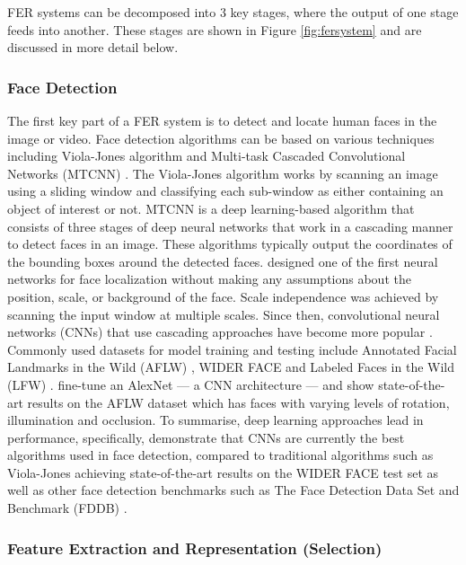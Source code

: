 \documentclass[12pt, a4paper]{article}
\begin{document}
FER systems can be decomposed into 3 key stages, where the output of one stage feeds into another. These stages are shown in Figure \ref{fig:fersystem} and are discussed in more detail below. 

\subsubsection{Face Detection}
\label{facedet}
The first key part of a FER system is to detect and locate human faces in the image or video. Face detection algorithms can be based on various techniques including Viola-Jones algorithm \citep{viola2001rapid} and Multi-task Cascaded Convolutional Networks (MTCNN) \citep{xiang2017joint}. The Viola-Jones algorithm  works by scanning an image using a sliding window and classifying each sub-window as either containing an object of interest or not. MTCNN is a deep learning-based algorithm that consists of three stages of deep neural networks that work in a cascading manner to detect faces in an image. These algorithms typically output the coordinates of the bounding boxes around the detected faces. \cite{vaillant1994original} designed one of the first neural networks for face localization without making any assumptions about the position, scale, or background of the face. Scale independence was achieved by scanning the input window at multiple scales. Since then, convolutional neural networks (CNNs) that use cascading approaches have become more popular \citep{li2015convolutional, xiang2017joint}. Commonly used datasets for model training and testing include Annotated Facial Landmarks in the Wild (AFLW) \citep{koestinger2011annotated}, WIDER FACE \citep{yang2016wider} and Labeled Faces in the Wild (LFW) \citep{huang2008labeled}. \cite{farfade2015multi} fine-tune an AlexNet --- a CNN architecture --- and show state-of-the-art results on the AFLW dataset which has faces with varying levels of rotation, illumination and occlusion. To summarise, deep learning approaches lead in performance, specifically, \cite{jiang2017face} demonstrate that CNNs are currently the best algorithms used in face detection, compared to traditional algorithms such as Viola-Jones achieving state-of-the-art results on the WIDER FACE test set as well as other face detection benchmarks such as The Face Detection Data Set and Benchmark (FDDB) \citep{fddbTech}.

\subsubsection{Feature Extraction and Representation (Selection)}
\end{document}
